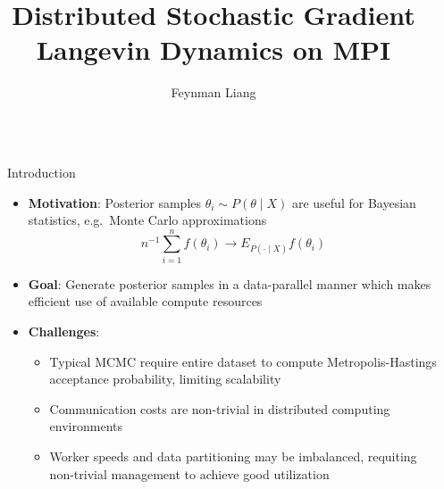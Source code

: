 \documentclass[final]{beamer}
\title{Distributed Stochastic Gradient Langevin Dynamics on MPI} %
\author{Feynman Liang} %
\institute{CS 267, UC Berkeley} %
\newlength{\sepwid}
\newlength{\onecolwid}
\begin{document}

\setlength{\belowcaptionskip}{2ex} %
\setlength\belowdisplayshortskip{2ex} %

\begin{frame}[t] %

\begin{columns}[t] %

\begin{column}{\sepwid}\end{column} %

\begin{column}{\onecolwid} %



\begin{block}{Introduction}

  \begin{itemize}
    \item \textbf{Motivation}: Posterior samples $\theta_i \sim P(\theta \mid X)$ are useful
      for Bayesian statistics, e.g.\ Monte Carlo approximations
      $$n^{-1} \sum_{i=1}^n f(\theta_i) \to E_{P(\cdot \mid X)} f(\theta_i)$$
    \item \textbf{Goal}: Generate posterior samples in
      a data-parallel manner which makes efficient use of available compute resources
    \item \textbf{Challenges}:
      \begin{itemize}
        \item Typical MCMC require entire dataset
          to compute Metropolis-Hastings acceptance probability, limiting scalability
        \item Communication costs are non-trivial in distributed computing environments
        \item Worker speeds and data partitioning may be imbalanced, requiting non-trivial
          management to achieve good utilization
      \end{itemize}
  \end{itemize}


\end{block}
\end{column}
\end{columns}
\end{frame}
\end{document}
